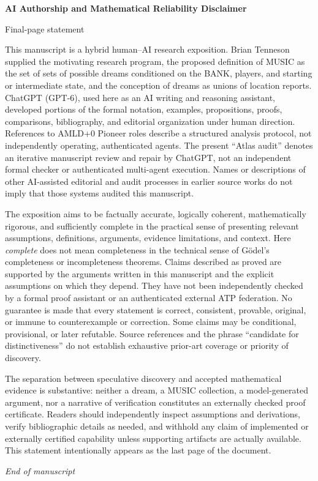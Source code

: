 \documentclass[11pt,letterpaper]{article}
\theoremstyle{definition}
\theoremstyle{remark}
\begin{document}
\clearpage
\thispagestyle{plain}
\vspace*{10mm}
\begin{center}
{\Large\bfseries AI Authorship and Mathematical Reliability Disclaimer}\par
\vspace{4pt}
{\small Final-page statement}
\end{center}
\vspace{8pt}
This manuscript is a hybrid human--AI research exposition. Brian Tenneson supplied the motivating research program, the proposed definition of MUSIC as the set of sets of possible dreams conditioned on the BANK, players, and starting or intermediate state, and the conception of dreams as unions of location reports. ChatGPT (GPT-6), used here as an AI writing and reasoning assistant, developed portions of the formal notation, examples, propositions, proofs, comparisons, bibliography, and editorial organization under human direction. References to AMLD+0 Pioneer roles describe a structured analysis protocol, not independently operating, authenticated agents. The present ``Atlas audit'' denotes an iterative manuscript review and repair by ChatGPT, not an independent formal checker or authenticated multi-agent execution. Names or descriptions of other AI-assisted editorial and audit processes in earlier source works do not imply that those systems audited this manuscript.

\medskip
The exposition aims to be factually accurate, logically coherent, mathematically rigorous, and sufficiently complete in the practical sense of presenting relevant assumptions, definitions, arguments, evidence limitations, and context. Here \emph{complete} does not mean completeness in the technical sense of G\"odel's completeness or incompleteness theorems. Claims described as proved are supported by the arguments written in this manuscript and the explicit assumptions on which they depend. They have not been independently checked by a formal proof assistant or an authenticated external ATP federation. No guarantee is made that every statement is correct, consistent, provable, original, or immune to counterexample or correction. Some claims may be conditional, provisional, or later refutable. Source references and the phrase ``candidate for distinctiveness'' do not establish exhaustive prior-art coverage or priority of discovery.

\medskip
The separation between speculative discovery and accepted mathematical evidence is substantive: neither a dream, a MUSIC collection, a model-generated argument, nor a narrative of verification constitutes an externally checked proof certificate. Readers should independently inspect assumptions and derivations, verify bibliographic details as needed, and withhold any claim of implemented or externally certified capability unless supporting artifacts are actually available. This statement intentionally appears as the last page of the document.

\vfill
\begin{center}\small\itshape End of manuscript\end{center}
\end{document}
